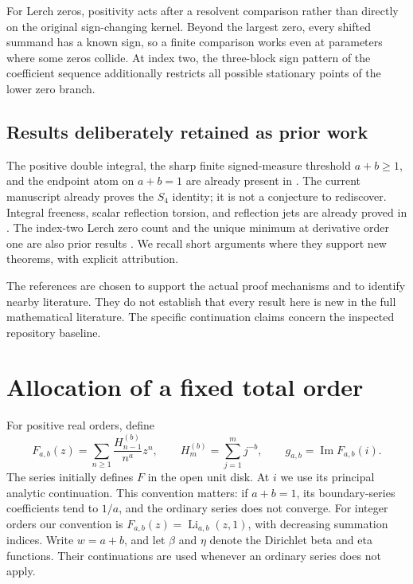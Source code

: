 \documentclass[11pt,a4paper]{article}
\numberwithin{equation}{section}
\theoremstyle{definition}
\theoremstyle{remark}
\DeclareMathOperator{\Li}{Li}
\renewcommand{\Im}{\operatorname{Im}}
\begin{document}
For Lerch zeros, positivity acts after a resolvent comparison rather
than directly on the original sign-changing kernel. Beyond the largest
zero, every shifted summand has a known sign, so a finite comparison
works even at parameters where some zeros collide. At index two,
the three-block sign pattern of the coefficient sequence additionally
restricts all possible stationary points of the lower zero branch.

\subsection{Results deliberately retained as prior work}

The positive double integral, the sharp finite signed-measure threshold
$a+b\ge1$, and the endpoint atom on $a+b=1$ are already present in
\cite{realorder}. The current manuscript already proves the $S_4$
identity; it is not a conjecture to rediscover. Integral freeness,
scalar reflection torsion, and reflection jets are already proved in
\cite{integraljets}. The index-two Lerch zero count and the unique
minimum at derivative order one are also prior results
\cite{lershape:Boundary}. We recall short arguments where they support
new theorems, with explicit attribution.

The references are chosen to support the actual proof mechanisms and
to identify nearby literature. They do not establish that every result
here is new in the full mathematical literature. The specific
continuation claims concern the inspected repository baseline.


\section{Allocation of a fixed total order}
\label{sec:allocation}

For positive real orders, define
\begin{equation}\label{eq:Fdef}
 F_{a,b}(z)=\sum_{n\ge1}\frac{H_{n-1}^{(b)}}{n^a}z^n,
 \qquad H_m^{(b)}=\sum_{j=1}^m j^{-b},\qquad
 g_{a,b}=\Im F_{a,b}(i).
\end{equation}
The series initially defines $F$ in the open unit disk. At $i$ we use its
principal analytic continuation. This convention matters: if $a+b=1$,
its boundary-series coefficients tend to $1/a$, and the ordinary series
does not converge. For integer orders our convention is
$F_{a,b}(z)=\Li_{a,b}(z,1)$, with decreasing summation indices.
Write $w=a+b$, and let $\beta$ and $\eta$ denote the Dirichlet beta and
eta functions. Their continuations are used whenever an ordinary series
does not apply.
\end{document}
